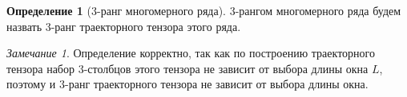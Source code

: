 \documentclass[specialist,
  substylefile=spbu.rtx,
subf,href,colorlinks=true, 12pt]{disser}
\theoremstyle{plain}
\theoremstyle{definition}
\newtheorem{definition}{Определение}[section]
\theoremstyle{remark}
\newtheorem*{remark}{Замечание}
\begin{document}

%
\begin{definition}[3-ранг многомерного ряда]
  3-рангом многомерного ряда будем назвать 3-ранг траекторного тензора этого ряда.
\end{definition}

\begin{remark}
  Определение корректно, так как по построению траекторного тензора набор 3-столбцов этого тензора
  не зависит от выбора длины окна $L$, поэтому и $3$-ранг траекторного тензора не зависит от выбора
  длины окна.
\end{remark}
\end{document}
